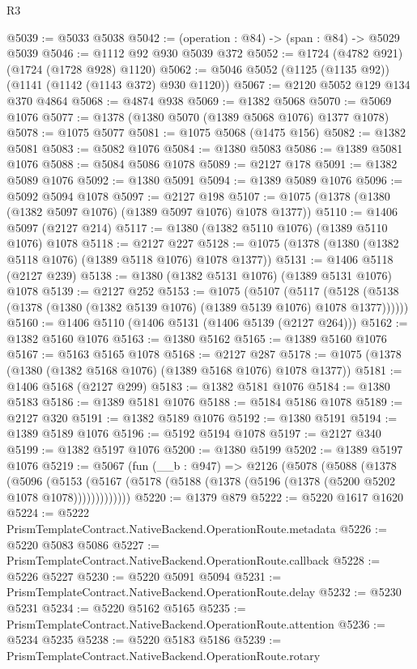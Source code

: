 \begin{lexlean}{R3}
\begin{coremodule}
@5039 := @5033 @5038
@5042 := (operation : @84) -> (span : @84) -> @5029 @5039
@5046 := @1112 @92 @930 @5039 @372
@5052 := @1724 (@4782 @921) (@1724 (@1728 @928) @1120)
@5062 := @5046 @5052 (@1125 (@1135 @92)) (@1141 (@1142 (@1143 @372) @930 @1120))
@5067 := @2120 @5052 @129 @134 @370 @4864
@5068 := @4874 @938
@5069 := @1382 @5068
@5070 := @5069 @1076
@5077 := @1378 (@1380 @5070 (@1389 @5068 @1076) @1377 @1078)
@5078 := @1075 @5077
@5081 := @1075 @5068 (@1475 @156)
@5082 := @1382 @5081
@5083 := @5082 @1076
@5084 := @1380 @5083
@5086 := @1389 @5081 @1076
@5088 := @5084 @5086 @1078
@5089 := @2127 @178
@5091 := @1382 @5089 @1076
@5092 := @1380 @5091
@5094 := @1389 @5089 @1076
@5096 := @5092 @5094 @1078
@5097 := @2127 @198
@5107 := @1075 (@1378 (@1380 (@1382 @5097 @1076) (@1389 @5097 @1076) @1078 @1377))
@5110 := @1406 @5097 (@2127 @214)
@5117 := @1380 (@1382 @5110 @1076) (@1389 @5110 @1076) @1078
@5118 := @2127 @227
@5128 := @1075 (@1378 (@1380 (@1382 @5118 @1076) (@1389 @5118 @1076) @1078 @1377))
@5131 := @1406 @5118 (@2127 @239)
@5138 := @1380 (@1382 @5131 @1076) (@1389 @5131 @1076) @1078
@5139 := @2127 @252
@5153 := @1075
    (@5107
      (@5117 (@5128 (@5138 (@1378 (@1380 (@1382 @5139 @1076) (@1389 @5139 @1076) @1078 @1377))))))
@5160 := @1406 @5110 (@1406 @5131 (@1406 @5139 (@2127 @264)))
@5162 := @1382 @5160 @1076
@5163 := @1380 @5162
@5165 := @1389 @5160 @1076
@5167 := @5163 @5165 @1078
@5168 := @2127 @287
@5178 := @1075 (@1378 (@1380 (@1382 @5168 @1076) (@1389 @5168 @1076) @1078 @1377))
@5181 := @1406 @5168 (@2127 @299)
@5183 := @1382 @5181 @1076
@5184 := @1380 @5183
@5186 := @1389 @5181 @1076
@5188 := @5184 @5186 @1078
@5189 := @2127 @320
@5191 := @1382 @5189 @1076
@5192 := @1380 @5191
@5194 := @1389 @5189 @1076
@5196 := @5192 @5194 @1078
@5197 := @2127 @340
@5199 := @1382 @5197 @1076
@5200 := @1380 @5199
@5202 := @1389 @5197 @1076
@5219 := @5067
    (fun (__b : @947) =>
    @2126
      (@5078
        (@5088
          (@1378
            (@5096
              (@5153 (@5167 (@5178 (@5188 (@1378 (@5196 (@1378 (@5200 @5202 @1078 @1078)))))))))))))
@5220 := @1379 @879
@5222 := @5220 @1617 @1620
@5224 := @5222 PrismTemplateContract.NativeBackend.OperationRoute.metadata
@5226 := @5220 @5083 @5086
@5227 := PrismTemplateContract.NativeBackend.OperationRoute.callback
@5228 := @5226 @5227
@5230 := @5220 @5091 @5094
@5231 := PrismTemplateContract.NativeBackend.OperationRoute.delay
@5232 := @5230 @5231
@5234 := @5220 @5162 @5165
@5235 := PrismTemplateContract.NativeBackend.OperationRoute.attention
@5236 := @5234 @5235
@5238 := @5220 @5183 @5186
@5239 := PrismTemplateContract.NativeBackend.OperationRoute.rotary

\end{coremodule}
\end{lexlean}
